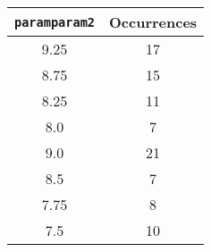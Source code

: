 \documentclass[letterpaper, 12pt]{article}
\begin{document}
\begin{longtable}{|c|c|}
\hline
\textbf{\texttt{paramparam2}} & \textbf{Occurrences} \\
\hline
9.25 & 17 \\
\hline
8.75 & 15 \\
\hline
8.25 & 11 \\
\hline
8.0 & 7 \\
\hline
9.0 & 21 \\
\hline
8.5 & 7 \\
\hline
7.75 & 8 \\
\hline
7.5 & 10 \\
\hline
\end{longtable}
\end{document}
